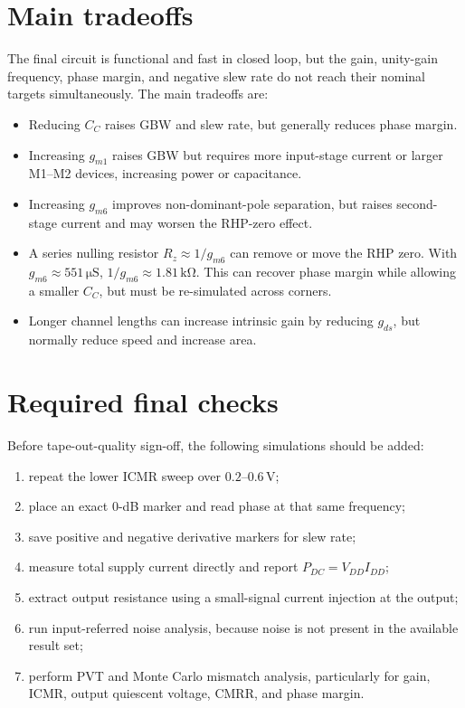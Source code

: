 \documentclass[11pt,a4paper]{report}
\newcommand{\micro}{\mu}
\newcommand{\ohm}{\Omega}
\newcommand{\SI}[2]{\ensuremath{#1\,\mathrm{#2}}}
\newcommand{\SIrange}[3]{\ensuremath{#1\text{--}#2\,\mathrm{#3}}}
\begin{document}
\section{Main tradeoffs}
The final circuit is functional and fast in closed loop, but the gain, unity-gain frequency, phase margin, and negative slew rate do not reach their nominal targets simultaneously. The main tradeoffs are:
\begin{itemize}[leftmargin=18mm]
  \item Reducing $C_C$ raises GBW and slew rate, but generally reduces phase margin.
  \item Increasing $g_{m1}$ raises GBW but requires more input-stage current or larger M1--M2 devices, increasing power or capacitance.
  \item Increasing $g_{m6}$ improves non-dominant-pole separation, but raises second-stage current and may worsen the RHP-zero effect.
  \item A series nulling resistor $R_z\approx1/g_{m6}$ can remove or move the RHP zero. With $g_{m6}\approx\SI{551}{\micro S}$, $1/g_{m6}\approx\SI{1.81}{k\ohm}$. This can recover phase margin while allowing a smaller $C_C$, but must be re-simulated across corners.
  \item Longer channel lengths can increase intrinsic gain by reducing $g_{ds}$, but normally reduce speed and increase area.
\end{itemize}

\section{Required final checks}
Before tape-out-quality sign-off, the following simulations should be added:
\begin{enumerate}[leftmargin=18mm]
  \item repeat the lower ICMR sweep over \SIrange{0.2}{0.6}{V};
  \item place an exact 0-dB marker and read phase at that same frequency;
  \item save positive and negative derivative markers for slew rate;
  \item measure total supply current directly and report $P_{DC}=V_{DD}I_{DD}$;
  \item extract output resistance using a small-signal current injection at the output;
  \item run input-referred noise analysis, because noise is not present in the available result set;
  \item perform PVT and Monte Carlo mismatch analysis, particularly for gain, ICMR, output quiescent voltage, CMRR, and phase margin.
\end{enumerate}
\end{document}
